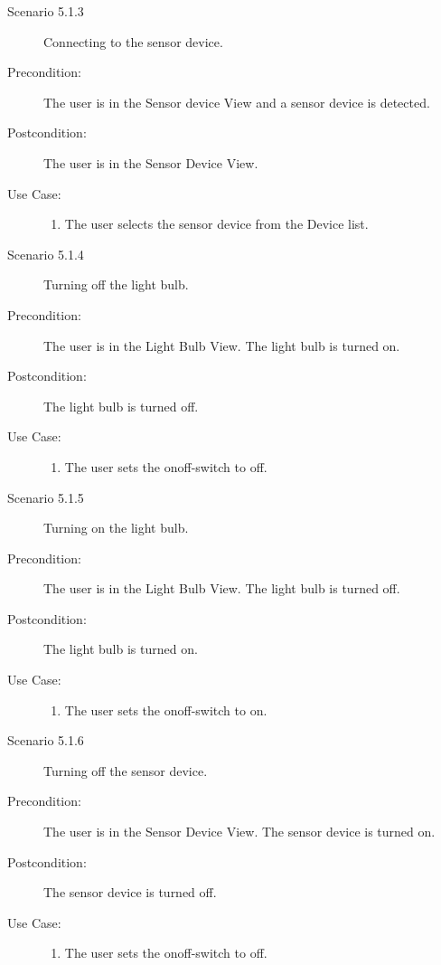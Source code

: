 \documentclass[a4paper]{article}
\begin{document}
\begin{description}
\item[Scenario 5.1.3] Connecting to the sensor device.
\item[Precondition:] The user is in the Sensor device View and a sensor device is detected.
\item[Postcondition:] The user is in the Sensor Device View.
\item[Use Case:]\mbox{}
\begin{enumerate}
\item  The user selects the sensor device from the Device list.
\end{enumerate}

\item[]

\item[Scenario 5.1.4] Turning off the light bulb.
\item[Precondition:] The user is in the Light Bulb View. The light bulb is turned on.
\item[Postcondition:] The light bulb is turned off.
\item[Use Case:]\mbox{}
\begin{enumerate}
\item  The user sets the onoff-switch to off.
\end{enumerate}

\item[]

\item[Scenario 5.1.5] Turning on the light bulb.
\item[Precondition:] The user is in the Light Bulb View. The light bulb is turned off.
\item[Postcondition:] The light bulb is turned on.
\item[Use Case:]\mbox{}
\begin{enumerate}
\item  The user sets the onoff-switch to on.
\end{enumerate}

\item[]

\item[Scenario 5.1.6] Turning off the sensor device.
\item[Precondition:] The user is in the Sensor Device View. The sensor device is turned on.
\item[Postcondition:] The sensor device is turned off.
\item[Use Case:]\mbox{}
\begin{enumerate}
\item  The user sets the onoff-switch to off.
\end{enumerate}


\end{description}
\end{document}
